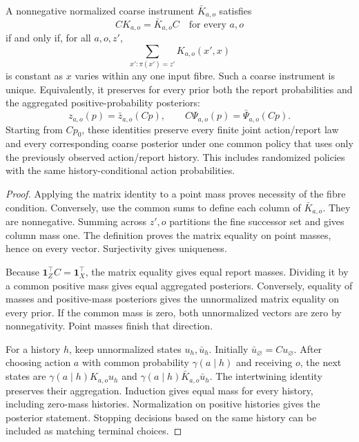\begin{theorem}\label{r:instrument}
A nonnegative normalized coarse instrument $\bar K_{a,o}$ satisfies
\[
 CK_{a,o}=\bar K_{a,o}C\quad\text{for every }a,o
\]
if and only if, for all $a,o,z'$,
\[
 \sum_{x':\pi(x')=z'}K_{a,o}(x',x)
\]
is constant as $x$ varies within any one input fibre. Such a coarse instrument is unique. Equivalently, it preserves for every prior both the report probabilities and the aggregated positive-probability posteriors:
\[
 z_{a,o}(p)=\bar z_{a,o}(Cp),\qquad C\Psi_{a,o}(p)=\bar\Psi_{a,o}(Cp).
\]
Starting from $Cp_0$, these identities preserve every finite joint action/report law and every corresponding coarse posterior under one common policy that uses only the previously observed action/report history. This includes randomized policies with the same history-conditional action probabilities.
\end{theorem}
\begin{proof}
Applying the matrix identity to a point mass proves necessity of the fibre condition. Conversely, use the common sums to define each column of $\bar K_{a,o}$. They are nonnegative. Summing across $z',o$ partitions the fine successor set and gives column mass one. The definition proves the matrix equality on point masses, hence on every vector. Surjectivity gives uniqueness.

Because $\mathbf1_Z^\top C=\mathbf1_X^\top$, the matrix equality gives equal report masses. Dividing it by a common positive mass gives equal aggregated posteriors. Conversely, equality of masses and positive-mass posteriors gives the unnormalized matrix equality on every prior. If the common mass is zero, both unnormalized vectors are zero by nonnegativity. Point masses finish that direction.

For a history $h$, keep unnormalized states $u_h,\bar u_h$. Initially $\bar u_\varnothing=Cu_\varnothing$. After choosing action $a$ with common probability $\gamma(a\mid h)$ and receiving $o$, the next states are $\gamma(a\mid h)K_{a,o}u_h$ and $\gamma(a\mid h)\bar K_{a,o}\bar u_h$. The intertwining identity preserves their aggregation. Induction gives equal mass for every history, including zero-mass histories. Normalization on positive histories gives the posterior statement. Stopping decisions based on the same history can be included as matching terminal choices.
\end{proof}

